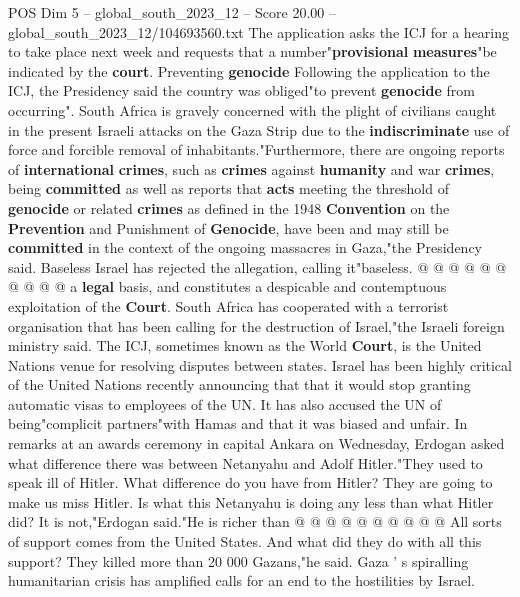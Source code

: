 \begin{textsample}{POS Dim 5 – global\_south\_2023\_12 – Score 20.00 – global\_south\_2023\_12/104693560.txt}
The application asks the ICJ for a hearing to take place next week and requests that a number"\textbf{provisional} \textbf{measures}"be indicated by the \textbf{court}.
Preventing \textbf{genocide} Following the application to the ICJ, the Presidency said the country was obliged"to prevent \textbf{genocide} from occurring".
South Africa is gravely concerned with the plight of civilians caught in the present Israeli attacks on the Gaza Strip due to the \textbf{indiscriminate} use of force and forcible removal of inhabitants."Furthermore, there are ongoing reports of \textbf{international} \textbf{crimes}, such as \textbf{crimes} against \textbf{humanity} and war \textbf{crimes}, being \textbf{committed} as well as reports that \textbf{acts} meeting the threshold of \textbf{genocide} or related \textbf{crimes} as defined in the 1948 \textbf{Convention} on the \textbf{Prevention} and Punishment of \textbf{Genocide}, have been and may still be \textbf{committed} in the context of the ongoing massacres in Gaza,"the Presidency said.
Baseless Israel has rejected the allegation, calling it"baseless. @ @ @ @ @ @ @ @ @ @ a \textbf{legal} basis, and constitutes a despicable and contemptuous exploitation of the \textbf{Court}.
South Africa has cooperated with a terrorist organisation that has been calling for the destruction of Israel,"the Israeli foreign ministry said.
The ICJ, sometimes known as the World \textbf{Court}, is the United Nations venue for resolving disputes between states.
Israel has been highly critical of the United Nations recently announcing that that it would stop granting automatic visas to employees of the UN.
It has also accused the UN of being"complicit partners"with Hamas and that it was biased and unfair.
In remarks at an awards ceremony in capital Ankara on Wednesday, Erdogan asked what difference there was between Netanyahu and Adolf Hitler."They used to speak ill of Hitler.
What difference do you have from Hitler?
They are going to make us miss Hitler.
Is what this Netanyahu is doing any less than what Hitler did?
It is not,"Erdogan said."He is richer than @ @ @ @ @ @ @ @ @ @ All sorts of support comes from the United States.
And what did they do with all this support?
They killed more than 20 000 Gazans,"he said.
Gaza ' s spiralling humanitarian crisis has amplified calls for an end to the hostilities by Israel.

\end{textsample}

